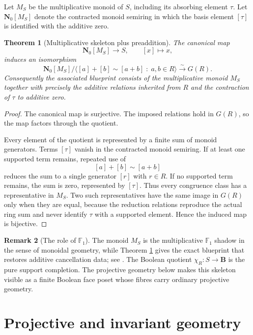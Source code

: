 \documentclass[11pt]{amsart}
\numberwithin{equation}{section}
\newtheorem{theorem}{Theorem}[section]
\theoremstyle{definition}
\newtheorem{remark}[theorem]{Remark}
\newcommand{\B}{\mathbf B}
\newcommand{\N}{\mathbf N}
\begin{document}
Let $M_S$ be the multiplicative monoid of $S$, including its absorbing element $\tau$.  Let $\N_0[M_S]$ denote the contracted monoid semiring in which the basis element $[\tau]$ is identified with the additive zero.

\begin{theorem}[Multiplicative skeleton plus preaddition]\label{thm:blueprint-presentation}
The canonical map
\[
\N_0[M_S]\longrightarrow S,
\qquad
[x]\longmapsto x,
\]
induces an isomorphism
\[
\N_0[M_S]\Big/\Big\langle [a]+[b]\sim[a+b]
\;:\;a,b\in R\Big\rangle
\xrightarrow{\sim}
G(R).
\]
Consequently the associated blueprint consists of the multiplicative monoid $M_S$ together with precisely the additive relations inherited from $R$ and the contraction of $\tau$ to additive zero.
\end{theorem}

\begin{proof}
The canonical map is surjective.  The imposed relations hold in $G(R)$, so the map factors through the quotient.

Every element of the quotient is represented by a finite sum of monoid generators.  Terms $[\tau]$ vanish in the contracted monoid semiring.  If at least one supported term remains, repeated use of
\[
[a]+[b]\sim[a+b]
\]
reduces the sum to a single generator $[r]$ with $r\in R$.  If no supported term remains, the sum is zero, represented by $[\tau]$.  Thus every congruence class has a representative in $M_S$.  Two such representatives have the same image in $G(R)$ only when they are equal, because the reduction relations reproduce the actual ring sum and never identify $\tau$ with a supported element.  Hence the induced map is bijective.
\end{proof}

\begin{remark}[The role of $\mathbb F_1$]
The monoid $M_S$ is the multiplicative $\mathbb F_1$ shadow in the sense of monoidal geometry, while Theorem \ref{thm:blueprint-presentation} gives the exact blueprint that restores additive cancellation data; see \cite{Deitmar,Lorscheid}.  The Boolean quotient $\chi_R:S\to\B$ is the pure support completion.  The projective geometry below makes this skeleton visible as a finite Boolean face poset whose fibres carry ordinary projective geometry.
\end{remark}



\part{Projective and invariant geometry}
\end{document}
